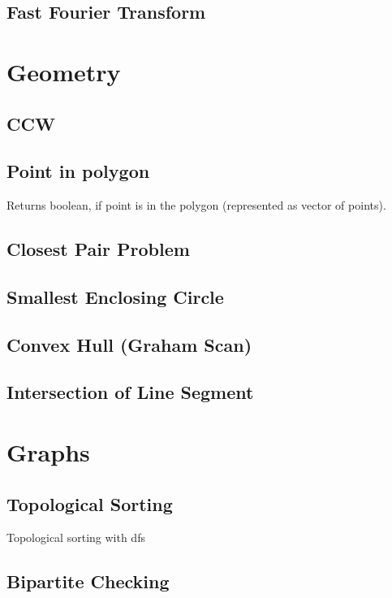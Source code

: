 \documentclass[landscape,8pt]{article}
\begin{document}
\begin{multicols}{2}
  \subsection{Fast Fourier Transform}
\columnbreak
\section{Geometry}
  \subsection{CCW}
    

  \subsection{Point in polygon}
    Returns boolean, if point is in the polygon (represented as vector of points).
    
  \subsection{Closest Pair Problem}

  \subsection{Smallest Enclosing Circle}

  \subsection{Convex Hull (Graham Scan)}

  \subsection{Intersection of Line Segment}

\columnbreak
\section{Graphs}
  \subsection{Topological Sorting}
  Topological sorting with dfs
    

  \subsection{Bipartite Checking}
    


\end{multicols}
\end{document}
